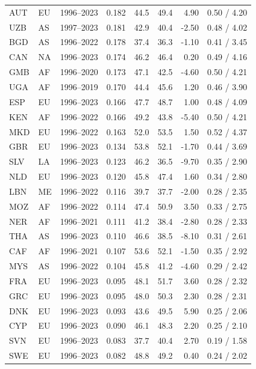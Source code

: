\begin{table}[H]
\begin{threeparttable}
\begin{tabular}{llrrrrrr}
AUT & EU & 1996--2023 & 0.182 & 44.5 & 49.4 & 4.90 & 0.50 / 4.20 \\
UZB & AS & 1997--2023 & 0.181 & 42.9 & 40.4 & -2.50 & 0.48 / 4.02 \\
BGD & AS & 1996--2022 & 0.178 & 37.4 & 36.3 & -1.10 & 0.41 / 3.45 \\
CAN & NA & 1996--2023 & 0.174 & 46.2 & 46.4 & 0.20 & 0.49 / 4.16 \\
GMB & AF & 1996--2020 & 0.173 & 47.1 & 42.5 & -4.60 & 0.50 / 4.21 \\
UGA & AF & 1996--2019 & 0.170 & 44.4 & 45.6 & 1.20 & 0.46 / 3.90 \\
ESP & EU & 1996--2023 & 0.166 & 47.7 & 48.7 & 1.00 & 0.48 / 4.09 \\
KEN & AF & 1996--2022 & 0.166 & 49.2 & 43.8 & -5.40 & 0.50 / 4.21 \\
MKD & EU & 1996--2022 & 0.163 & 52.0 & 53.5 & 1.50 & 0.52 / 4.37 \\
GBR & EU & 1996--2023 & 0.134 & 53.8 & 52.1 & -1.70 & 0.44 / 3.69 \\
SLV & LA & 1996--2023 & 0.123 & 46.2 & 36.5 & -9.70 & 0.35 / 2.90 \\
NLD & EU & 1996--2023 & 0.120 & 45.8 & 47.4 & 1.60 & 0.34 / 2.80 \\
LBN & ME & 1996--2022 & 0.116 & 39.7 & 37.7 & -2.00 & 0.28 / 2.35 \\
MOZ & AF & 1996--2022 & 0.114 & 47.4 & 50.9 & 3.50 & 0.33 / 2.75 \\
NER & AF & 1996--2021 & 0.111 & 41.2 & 38.4 & -2.80 & 0.28 / 2.33 \\
THA & AS & 1996--2023 & 0.110 & 46.6 & 38.5 & -8.10 & 0.31 / 2.61 \\
CAF & AF & 1996--2021 & 0.107 & 53.6 & 52.1 & -1.50 & 0.35 / 2.92 \\
MYS & AS & 1996--2022 & 0.104 & 45.8 & 41.2 & -4.60 & 0.29 / 2.42 \\
FRA & EU & 1996--2023 & 0.095 & 48.1 & 51.7 & 3.60 & 0.28 / 2.32 \\
GRC & EU & 1996--2023 & 0.095 & 48.0 & 50.3 & 2.30 & 0.28 / 2.31 \\
DNK & EU & 1996--2023 & 0.093 & 43.6 & 49.5 & 5.90 & 0.25 / 2.06 \\
CYP & EU & 1996--2023 & 0.090 & 46.1 & 48.3 & 2.20 & 0.25 / 2.10 \\
SVN & EU & 1996--2023 & 0.083 & 37.7 & 40.4 & 2.70 & 0.19 / 1.58 \\
SWE & EU & 1996--2023 & 0.082 & 48.8 & 49.2 & 0.40 & 0.24 / 2.02 \\

\end{tabular}
\end{threeparttable}
\end{table}
